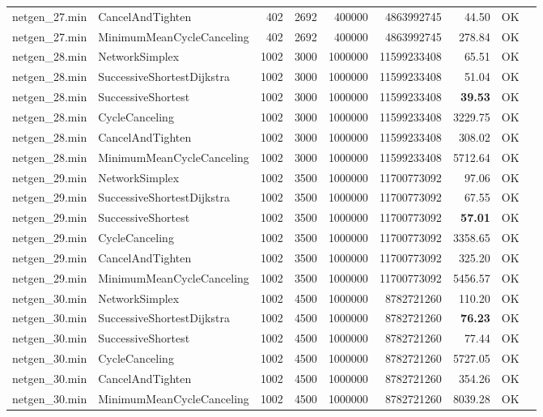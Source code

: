 \begin{longtable}{llrrrrrrl}
netgen\_27.min & CancelAndTighten & 402 & 2692 & 400000 & 4863992745 & 44.50 & OK \\
netgen\_27.min & MinimumMeanCycleCanceling & 402 & 2692 & 400000 & 4863992745 & 278.84 & OK \\
\midrule
netgen\_28.min & NetworkSimplex & 1002 & 3000 & 1000000 & 11599233408 & 65.51 & OK \\
netgen\_28.min & SuccessiveShortestDijkstra & 1002 & 3000 & 1000000 & 11599233408 & 51.04 & OK \\
netgen\_28.min & SuccessiveShortest & 1002 & 3000 & 1000000 & 11599233408 & \textbf{39.53} & OK \\
netgen\_28.min & CycleCanceling & 1002 & 3000 & 1000000 & 11599233408 & 3229.75 & OK \\
netgen\_28.min & CancelAndTighten & 1002 & 3000 & 1000000 & 11599233408 & 308.02 & OK \\
netgen\_28.min & MinimumMeanCycleCanceling & 1002 & 3000 & 1000000 & 11599233408 & 5712.64 & OK \\
\midrule
netgen\_29.min & NetworkSimplex & 1002 & 3500 & 1000000 & 11700773092 & 97.06 & OK \\
netgen\_29.min & SuccessiveShortestDijkstra & 1002 & 3500 & 1000000 & 11700773092 & 67.55 & OK \\
netgen\_29.min & SuccessiveShortest & 1002 & 3500 & 1000000 & 11700773092 & \textbf{57.01} & OK \\
netgen\_29.min & CycleCanceling & 1002 & 3500 & 1000000 & 11700773092 & 3358.65 & OK \\
netgen\_29.min & CancelAndTighten & 1002 & 3500 & 1000000 & 11700773092 & 325.20 & OK \\
netgen\_29.min & MinimumMeanCycleCanceling & 1002 & 3500 & 1000000 & 11700773092 & 5456.57 & OK \\
\midrule
netgen\_30.min & NetworkSimplex & 1002 & 4500 & 1000000 & 8782721260 & 110.20 & OK \\
netgen\_30.min & SuccessiveShortestDijkstra & 1002 & 4500 & 1000000 & 8782721260 & \textbf{76.23} & OK \\
netgen\_30.min & SuccessiveShortest & 1002 & 4500 & 1000000 & 8782721260 & 77.44 & OK \\
netgen\_30.min & CycleCanceling & 1002 & 4500 & 1000000 & 8782721260 & 5727.05 & OK \\
netgen\_30.min & CancelAndTighten & 1002 & 4500 & 1000000 & 8782721260 & 354.26 & OK \\
netgen\_30.min & MinimumMeanCycleCanceling & 1002 & 4500 & 1000000 & 8782721260 & 8039.28 & OK \\

\end{longtable}
